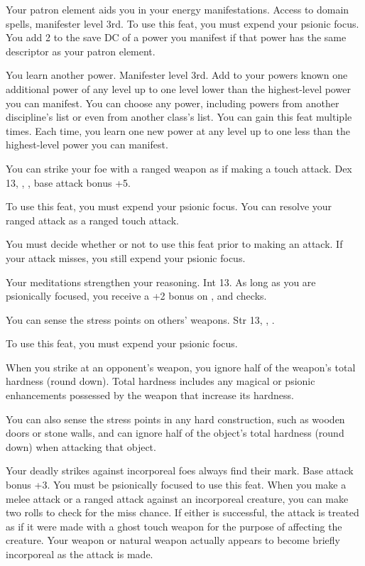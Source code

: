 {Your patron element aids you in your energy manifestations.}
{Access to domain spells, manifester level 3rd.}
{To use this feat, you must expend your psionic focus. You add 2 to the save DC of a power you manifest if that power has the same descriptor as your patron element.}
{}{}

{You learn another power.}
{Manifester level 3rd.}
{Add to your powers known one additional power of any level up to one level lower than the highest-level power you can manifest. You can choose any power, including powers from another discipline's list or even from another class's list.}
{}
{You can gain this feat multiple times. Each time, you learn one new power at any level up to one less than the highest-level power you can manifest.}

{You can strike your foe with a ranged weapon as if making a touch attack.}
{Dex 13, , , base attack bonus +5.}
{To use this feat, you must expend your psionic focus. You can resolve your ranged attack as a ranged touch attack.

You must decide whether or not to use this feat prior to making an attack. If your attack misses, you still expend your psionic focus.}
{}{}

{Your meditations strengthen your reasoning.}
{Int 13.}
{As long as you are psionically focused, you receive a +2 bonus on ,  and  checks.}
{}{}

{You can sense the stress points on others' weapons.}
{Str 13, , .}
{To use this feat, you must expend your psionic focus.

When you strike at an opponent's weapon, you ignore half of the weapon's total hardness (round down). Total hardness includes any magical or psionic enhancements possessed by the weapon that increase its hardness.}
{}
{You can also sense the stress points in any hard construction, such as wooden doors or stone walls, and can ignore half of the object's total hardness (round down) when attacking that object.}

{Your deadly strikes against incorporeal foes always find their mark.}
{Base attack bonus +3.}
{You must be psionically focused to use this feat. When you make a melee attack or a ranged attack against an incorporeal creature, you can make two rolls to check for the miss chance. If either is successful, the attack is treated as if it were made with a ghost touch weapon for the purpose of affecting the creature. Your weapon or natural weapon actually appears to become briefly incorporeal as the attack is made.}
{}{}

